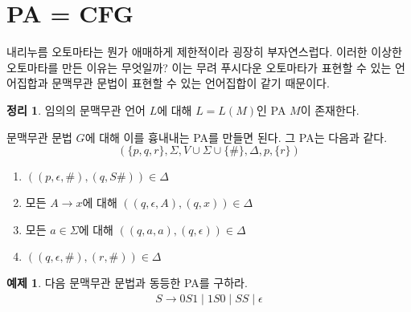 \documentclass[b5paper]{book}
\theoremstyle{definition}
\newtheorem{thm}{정리}[chapter]
\newtheorem{ex}{예제}[chapter]
\newenvironment{pf*}{\pushQED{\qed}\pf}{\popQED\endpf}
\begin{document}
\section{PA = CFG}
내리누름 오토마타는 뭔가 애매하게 제한적이라 굉장히 부자연스럽다. 이러한 이상한
 오토마타를 만든 이유는 무엇일까?
이는 무려 푸시다운 오토마타가 표현할 수 있는 언어집합과 문맥무관 문법이 표현할 수 
있는 언어집합이 같기 때문이다.
\begin{thm}
임의의 문맥무관 언어 $L$에 대해 $L = L(M)$인 PA $M$이 존재한다.
\end{thm}
\begin{pf*}
문맥무관 문법 $G$에 대해 이를 흉내내는 PA를 만들면 된다. 그 PA는 다음과 같다. 
$$(\{p,q,r\}, \Sigma, V \cup \Sigma \cup \{\#\}, \Delta, p, \{r\})$$
\begin{enumerate}
    \item $((p,\epsilon, \#), (q, S\#)) \in \Delta$
    \item 모든 $A \rightarrow x$에 대해 $((q, \epsilon, A), (q, x)) \in \Delta$
    \item 모든 $a \in \Sigma$에 대해 $((q, a, a) , (q, \epsilon)) \in \Delta$
    \item $((q, \epsilon, \#), (r, \#)) \in \Delta$
\end{enumerate}

\end{pf*}
\begin{ex}
다음 문맥무관 문법과 동등한 PA를 구하라.
\begin{align*}
    S \rightarrow 0S1 \;\vert\; 1S0 \;\vert\; SS \;\vert\; \epsilon
\end{align*}
\begin{figure}[!ht]
    \centering
    \caption{} 
    \label{cfg=pa}
\end{figure}
\end{ex}
\end{document}
